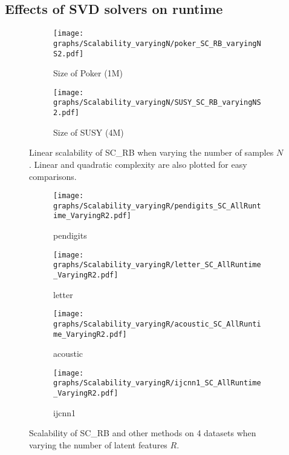 \documentclass[sigconf]{acmart}
\newcommand{\1}{\boldsymbol{1}}
\newcommand{\0}{\boldsymbol{0}}
\begin{document}
\subsection{Effects of SVD solvers on runtime}

\begin{figure}[!htb]
\centering
	  \begin{subfigure}[b]{0.23\textwidth}
      \texttt{[image: graphs/Scalability\_varyingN/poker\_SC\_RB\_varyingNS2.pdf]}
      \caption{Size of Poker (1M)}
      \label{fig:scalability_varyingN_poker}
      \end{subfigure}
	  \begin{subfigure}[b]{0.23\textwidth}
      \texttt{[image: graphs/Scalability\_varyingN/SUSY\_SC\_RB\_varyingNS2.pdf]}
      \caption{Size of SUSY (4M)}
      \label{fig:scalability_varyingN_susy}
      \end{subfigure}
\caption{Linear scalability of SC\_RB when varying the number of samples $N$. Linear and quadratic complexity are also plotted for easy comparisons.}
\label{fig:scalability_varyingN}
\end{figure}

\begin{figure*}[!htb]
\centering
	  \begin{subfigure}[b]{0.23\textwidth}
      \texttt{[image: graphs/Scalability\_varyingR/pendigits\_SC\_AllRuntime\_VaryingR2.pdf]}
      \caption{pendigits}
      \label{fig:scalability_varyingR_pendigits}
      \end{subfigure}
	  \begin{subfigure}[b]{0.23\textwidth}
      \texttt{[image: graphs/Scalability\_varyingR/letter\_SC\_AllRuntime\_VaryingR2.pdf]}
      \caption{letter}
      \label{fig:scalability_varyingR_letter}
      \end{subfigure}
      \begin{subfigure}[b]{0.23\textwidth}
      \texttt{[image: graphs/Scalability\_varyingR/acoustic\_SC\_AllRuntime\_VaryingR2.pdf]}
      \caption{acoustic}
      \label{fig:scalability_varyingR_acoustic}
      \end{subfigure}
       \begin{subfigure}[b]{0.23\textwidth}
      \texttt{[image: graphs/Scalability\_varyingR/ijcnn1\_SC\_AllRuntime\_VaryingR2.pdf]}
      \caption{ijcnn1}
      \label{fig:scalability_varyingR_ijcnn1}
      \end{subfigure}
\caption{Scalability of SC\_RB and other methods on 4 datasets when varying the number of latent features $R$.}
\label{fig:scalability_varyingR}
\end{figure*}
\end{document}
